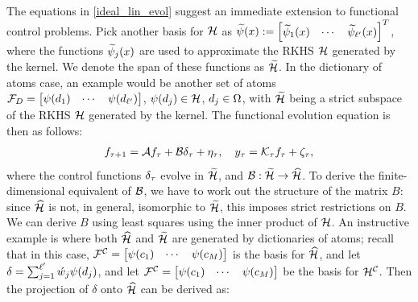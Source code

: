 The equations in \eqref{ideal_lin_evol} suggest an immediate extension to functional control problems. 
Pick another basis for $\mathcal{H}$ as $\widetilde{\psi}(x) := \begin{bmatrix}\widetilde{\psi}_1(x) &\cdots & \widetilde{\psi}_{\ell'}(x)
\end{bmatrix}^T$, where the functions $\widetilde{\psi}_j(x)$ are used to approximate the RKHS $\mathcal{H}$ generated by the kernel. We denote the span of these functions as $\widetilde{\mathcal{H}}$. In the dictionary of atoms case, an example would be another set of atoms
 $\mathcal{F}_{D} = \begin{bmatrix}\psi(d_1) &\cdots & \psi(d_{\ell'})
\end{bmatrix}$, $\psi(d_j)\in\mathcal{H}$, $d_j\in\Omega$, with $\widetilde{\mathcal{H}}$ being a strict subspace of the RKHS $\mathcal{H}$  generated by the kernel. 
The functional evolution equation is then as follows:
\begin{align}\eqlabel{ideal_lin_evol_control}
 f_{\tindex+1} = \sysop f_{\tindex} + \controlop \control_{\tindex} + \eta_{\tindex}, \quad y_{\tindex} = \measop_{\tindex} f_{\tindex} + \zeta_{\tindex},
\end{align}
where the control functions $\delta_{\tau}$ evolve in $\widetilde{\mathcal{H}}$, and $\mathcal{B}:\widetilde{\mathcal{H}}\to\widehat{\mathcal{H}}$. To derive the finite-dimensional equivalent of $\mathcal{B}$, we have to work out the structure of the matrix $B$: since $\widehat{\mathcal{H}}$ is not, in general, isomorphic to $\widetilde{\mathcal{H}}$, this imposes strict restrictions on $B$. We can derive $B$ using least squares using the inner product of $\mathcal{H}$. An instructive example is where both $\widehat{\mathcal{H}}$ and $\widetilde{\mathcal{H}}$ are generated by dictionaries of atoms; recall that in this case, $\mathcal{F}^{\mathcal{C}} = 
 \begin{bmatrix}\psi(c_1) &\cdots & \psi(c_{M})
\end{bmatrix}$ is the basis for $\widehat{\mathcal{H}}$, and let $\delta = \sum_{j=1}^{\ell'}\acute{w}_j\psi(d_j)$, and let $\mathcal{F}^{\mathcal{C}} = 
 \begin{bmatrix}\psi(c_1) &\cdots & \psi(c_{M})
\end{bmatrix}$ be the basis for $\mathcal{H}^{\mathcal{C}}$. Then the projection of $\delta$ onto $\widehat{\mathcal{H}}$ can be derived as: 

